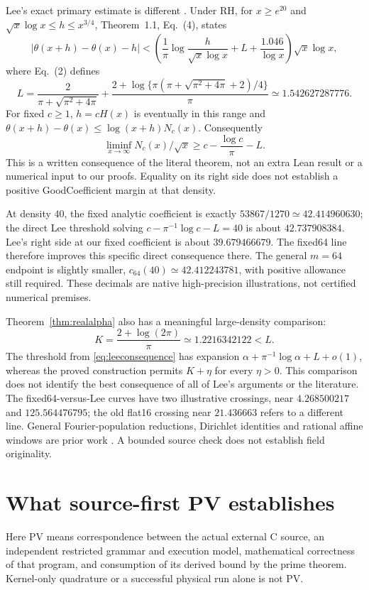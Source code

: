 \documentclass[11pt]{article}
\newcommand{\Kflat}{\frac{2+\log(2\pi)}{\pi}}
\begin{document}
Lee's exact primary estimate is different \cite[Theorem~1.1, Eqs.~(2) and (4)]{Lee}. Under RH, for \(x\ge e^{20}\) and
\(\sqrt{x}\log x\le h\le x^{3/4}\), Theorem~1.1, Eq.~(4), states
\[
 |\theta(x+h)-\theta(x)-h|
 <
 \left(\frac1\pi\log\frac{h}{\sqrt{x}\log x}
       +L+\frac{1.046}{\log x}\right)\sqrt{x}\log x,
 \tag{19}
\]
where Eq.~(2) defines
\[
 L=\frac2{\pi+\sqrt{\pi^2+4\pi}}
 +\frac{2+\log\{\pi(\pi+\sqrt{\pi^2+4\pi}+2)/4\}}{\pi}
 \simeq1.542627287776.
 \tag{20}
\]
For fixed \(c\ge1\), \(h=cH(x)\) is eventually in this range and
\(\theta(x+h)-\theta(x)\le\log(x+h)N_c(x)\). Consequently
\[
 \liminf_{x\to\infty}N_c(x)/\sqrt{x}\ge c-\frac{\log c}{\pi}-L.
 \tag{21}\label{eq:leeconsequence}
\]
This is a written consequence of the literal theorem, not an extra Lean
result or a numerical input to our proofs. Equality on its right side
does not establish a positive GoodCoefficient margin at that density.

At density \(40\), the fixed analytic coefficient is exactly
\(53867/1270\simeq42.414960630\); the direct Lee threshold solving
\(c-\pi^{-1}\log c-L=40\) is about \(42.737908384\).
Lee's right side at our fixed coefficient is about \(39.679466679\).
The fixed64 line therefore improves this specific direct consequence there.
The general \(m=64\) endpoint is slightly smaller,
\(c_{64}(40)\simeq42.412243781\), with positive allowance still required.
These decimals are native high-precision illustrations, not certified
numerical premises.

Theorem~\ref{thm:realalpha} also has a meaningful large-density comparison:
\[
 K=\Kflat\simeq1.2216342122<L.
\]
The threshold from \eqref{eq:leeconsequence} has expansion
\(\alpha+\pi^{-1}\log\alpha+L+o(1)\), whereas the proved construction
permits \(K+\eta\) for every \(\eta>0\). This comparison does not identify the
best consequence of all of Lee's arguments or the literature.
The fixed64-versus-Lee curves have two illustrative crossings, near
\(4.268500217\) and \(125.564476795\); the old flat16 crossing near
\(21.436663\) refers to a different line.
General Fourier-population reductions, Dirichlet identities and rational
affine windows are prior work \cite{CMS,CPDL,BR}. A bounded source check does
not establish field originality.

\section{What source-first PV establishes}
Here PV means correspondence between the actual external C source, an
independent restricted grammar and execution model, mathematical correctness
of that program, and consumption of its derived bound by the prime theorem.
Kernel-only quadrature or a successful physical run alone is not PV.
\end{document}
